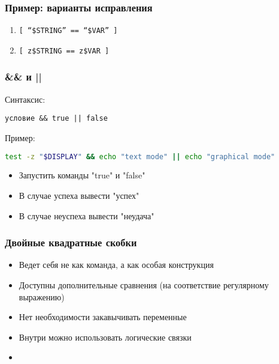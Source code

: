 \begin{frame}
	\frametitle{Пример: варианты исправления}

		\begin{enumerate}
			\item {\tt [ ``\$STRING'' == ``\$VAR'' ] }
			\item {\tt [ z\$STRING == z\$VAR ] }
		\end{enumerate}

\end{frame}

\begin{frame}[fragile]
\frametitle{\&\& и ||}
	Синтаксис:
\begin{verbatim}
условие && true || false
\end{verbatim}

	\pause
	Пример:
\begin{lstlisting}[language=bash]
test -z "$DISPLAY" && echo "text mode" || echo "graphical mode"
\end{lstlisting}
	
	\pause

	\begin{itemize}
	    \item Запустить команды "true" и "false"
	    \item В случае успеха вывести "успех"
	    \item В случае неуспеха вывести "неудача"
	\end{itemize}
\end{frame}

\begin{frame}[fragile]
\frametitle{Двойные квадратные скобки}
\begin{itemize}
\item Ведет себя не как команда, а как особая конструкция
\item Доступны дополнительные сравнения (на соответствие регулярному выражению)
\item Нет необходимости закавычивать переменные
\item Внутри можно использовать логические связки
\item 
\end{itemize}
\end{frame}


